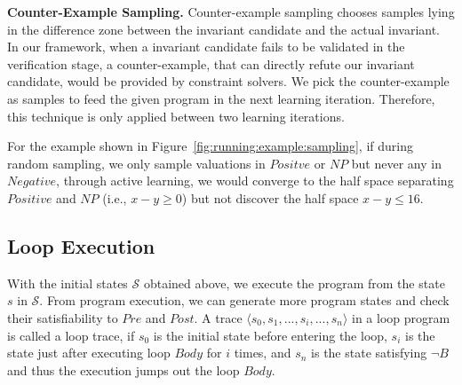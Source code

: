 \medskip\noindent
\textbf{Counter-Example Sampling.}
Counter-example sampling chooses samples lying in the difference zone between the invariant candidate and the actual invariant.
In our framework, when a invariant candidate fails to be validated in the verification stage,
a counter-example, that can directly refute our invariant candidate, would be provided by constraint solvers.
We pick the counter-example as samples to feed the given program in the next learning iteration.
Therefore, this technique is only applied between two learning iterations.



For the example shown in Figure~\ref{fig:running:example:sampling}, if during random sampling, we only sample valuations in $Positve$ or $NP$ but never any in $Negative$, through active learning, we would converge to the half space separating $Positive$ and $NP$ (i.e., $x-y \geq 0$) but not discover the half space $x - y \leq 16$.

\subsection {Loop Execution}
With the initial states $\mathcal{S}$ obtained above,
we execute the program from the state $s$ in $\mathcal{S}$.
From program execution,
we can generate more program states and check their satisfiability to $Pre$ and $Post$.
A trace $\langle s_0, s_1, ..., s_i, ..., s_n\rangle$ in a loop program is called a loop trace,
if $s_0$ is the initial state before entering the loop,
$s_i$ is the state just after executing loop $Body$ for $i$ times,
and $s_n$ is the state satisfying $\neg B$ and thus the execution jumps out the loop $Body$.

